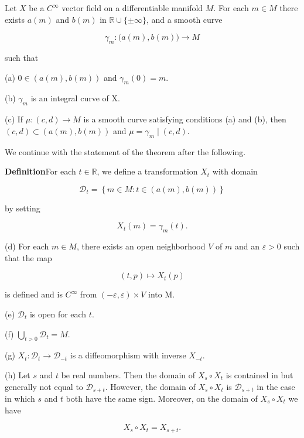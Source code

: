 \begin{theorem}\label{thm:1.48}
	Let $X$ be a $C^\infty$ vector field on a differentiable manifold $M$. For each $m\in M$ there exists $a(m)$ and $b(m)$ in $\mathbb{R}\cup\{\pm\infty\}$, and a smooth curve



	\begin{equation}
		\tag{1}\label{eq:1.48:1}
		\gamma_{m}\colon\big(a(m),b(m)\big)\to M
	\end{equation}

	such that

	(a)  $ 0 \in (a(m), b(m)) $ and  $ \gamma_m(0) = m $.

	(b)  $ \gamma_{m} $ is an integral curve of X.

	(c) If $\mu\colon(c,d)\to M$ is a smooth curve satisfying conditions (a) and (b), then $(c,d)\subset(a(m),b(m))$ and $\mu=\gamma_{m}\mid(c,d)$.

	We continue with the statement of the theorem after the following.

	\medskip\noindent\textbf{Definition}\quad For each $t\in\mathbb{R}$, we define a transformation $X_{t}$ with domain

	\begin{equation}
		\tag{2}\label{eq:1.48:2}
		\mathcal{D}_{t}=\left\{m\in M\colon t\in\left(a(m),b(m)\right)\right\}
	\end{equation}

	by setting



	\begin{equation}
		\tag{3}\label{eq:1.48:3}
		X_{t}(m)=\gamma_{m}(t).
	\end{equation}

	(d) For each $m \in M$, there exists an open neighborhood $V$ of $m$ and an $\varepsilon > 0$ such that the map



	\begin{equation}
		\tag{4}\label{eq:1.48:4}
		(t,p)\mapsto X_{t}(p)
	\end{equation}

	is defined and is  $ C^{\infty} $ from  $ (-\varepsilon,\varepsilon) \times V $ into M.

	(e) $\mathcal{D}_{t}$ is open for each $t$.

	(f) $\bigcup_{t>0} \mathcal{D}_{t} = M$.

	(g)  $ X_{t}\colon \mathcal{D}_{t} \to \mathcal{D}_{-t} $ is a diffeomorphism with inverse  $ X_{-t} $.

	(h) Let $s$ and $t$ be real numbers. Then the domain of $X_{s} \circ X_{t}$ is contained in but generally not equal to $\mathcal{D}_{s+t}$. However, the domain of $X_{s} \circ X_{t}$ is $\mathcal{D}_{s+t}$ in the case in which $s$ and $t$ both have the same sign. Moreover, on the domain of $X_{s} \circ X_{t}$ we have



	\begin{equation}
		\tag{5}\label{eq:1.48:5}
		X_{s}\circ X_{t}=X_{s+t}.
	\end{equation}

\end{theorem}

